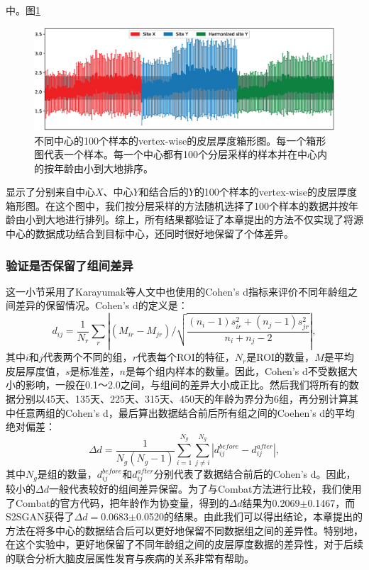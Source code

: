中。图\ref{fig:s2sgan_boxplot}
\begin{figure}[h]
\centering
\includegraphics[width=\textwidth]{figure/s2sgan_boxplot.eps}
\caption{不同中心的100个样本的vertex-wise的皮层厚度箱形图。每一个箱形图代表一个样本。每一个中心都有100个分层采样的样本并在中心内的按年龄由小到大地排序。}\label{fig:s2sgan_boxplot} 
\end{figure} 
显示了分别来自中心$X$、中心$Y$和结合后的$Y$的100个样本的vertex-wise的皮层厚度箱形图。在这个图中，我们按分层采样的方法随机选择了100个样本的数据并按年龄由小到大地进行排列。综上，所有结果都验证了本章提出的方法不仅实现了将源中心的数据成功结合到目标中心，还同时很好地保留了个体差异。

\subsubsection{验证是否保留了组间差异}
这一小节采用了Karayumak等人\cite{karayumak2019retrospective}文中也使用的Cohen's d指标来评价不同年龄组之间差异的保留情况。Cohen's d的定义是：
\begin{equation}
 {d_{ij}} = \frac{1}{{{N_r}}}\sum\limits_r {\left| {({M_{ir}} - {M_{jr}})/\sqrt {\frac{{({n_i} - 1)s_{ir}^2 + ({n_j} - 1)s_{jr}^2}}{{{n_i} + {n_j} - 2}}} } \right|},
\end{equation}
其中$i$和$j$代表两个不同的组，$r$代表每个ROI的特征，$N_r$是ROI的数量，$M$是平均皮层厚度值，$s$是标准差，$n$是每个组内样本的数量。因此，Cohen's d不受数据大小的影响，一般在0.1～2.0之间，与组间的差异大小成正比。然后我们将所有的数据分别以45天、135天、225天、315天、450天的年龄为界分为6组，再分别计算其中任意两组的Cohen's d，最后算出数据结合前后所有组之间的Coehen's d的平均绝对偏差：
\begin{equation}
     \Delta d = \frac{1}{{{N_g}({N_g} - 1)}}\sum\limits_{i = 1}^{{N_g}} {\sum\limits_{j \ne i}^{{N_g}} {\left| {d_{ij}^{before} - d_{ij}^{after}} \right|} },
\end{equation}
其中$N_g$是组的数量，$d_{ij}^{before}$和$d_{ij}^{after}$分别代表了数据结合前后的Cohen's d。因此，较小的$\Delta d$一般代表较好的组间差异保留。为了与Combat方法进行比较，我们使用了Combat的官方代码，把年龄作为协变量，得到的$\Delta d$结果为0.2069$\pm$0.1467，而S2SGAN获得了$\Delta d=$0.0683$\pm$0.0520的结果。由此我们可以得出结论，本章提出的方法在将多中心的数据结合后可以更好地保留不同数据组之间的差异性。特别地，在这个实验中，更好地保留了不同年龄组之间的皮层厚度数据的差异性，对于后续的联合分析大脑皮层属性发育与疾病的关系非常有帮助。

